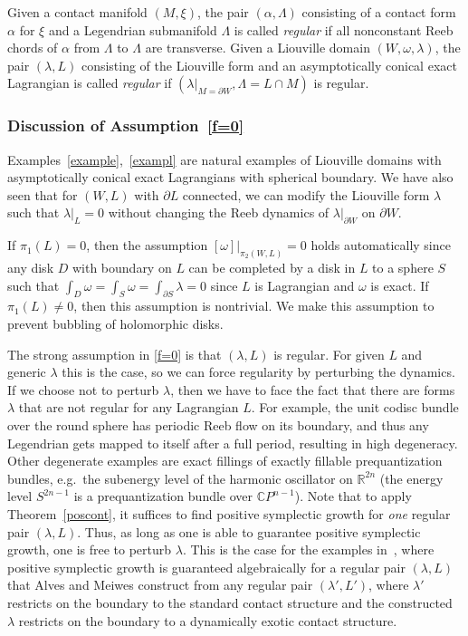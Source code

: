\documentclass{amsart}
\newcommand{\CC}{\mathbb{C}}
\newcommand{\RR}{\mathbb{R}}
\theoremstyle{definition}
\theoremstyle{remark}
\numberwithin{equation}{section}
\begin{document}
Given a contact manifold $(M,\xi)$, the pair $(\alpha,\Lambda)$ consisting of a contact form $\alpha$ for $\xi$ and a Legendrian submanifold $\Lambda$ is called \textit{regular} if all nonconstant Reeb chords of $\alpha$ from $\Lambda$ to $\Lambda$ are transverse. Given a Liouville domain $(W,\omega,\lambda)$, the pair $(\lambda, L)$ consisting of the Liouville form and an asymptotically conical exact Lagrangian is called \textit{regular} if $(\lambda|_{M=\partial W},\Lambda=L\cap M)$ is regular.

\subsubsection*{Discussion of Assumption~\ref{f=0}}
Examples~\ref{example},~\ref{exampl} are natural examples of Liouville domains with asymptotically conical exact Lagrangians with spherical boundary. We have also seen that for $(W,L)$ with $\partial L$ connected, we can modify the Liouville form $\lambda$ such that $\lambda|_L=0$ without changing the Reeb dynamics of $\lambda|_{\partial W}$ on $\partial W$. 

If $\pi_1(L)=0$, then the assumption $[\omega]|_{\pi_2(W,L)}=0$ holds automatically since any disk $D$ with boundary on $L$ can be completed by a disk in $L$ to a sphere $S$ such that $\int_D\omega=\int_S\omega =\int_{\partial S}\lambda=0$ since $L$ is Lagrangian and $\omega$ is exact. If $\pi_1(L)\neq 0$, then this assumption is nontrivial. We make this assumption to prevent bubbling of holomorphic disks.

The strong assumption in \ref{f=0} is that $(\lambda,L)$ is regular. For given $L$ and generic $\lambda$ this is the case, so we can force regularity by perturbing the dynamics. If we choose not to perturb $\lambda$, then we have to face the fact that there are forms $\lambda$ that are not regular for any Lagrangian $L$. For example, the unit codisc bundle over the round sphere has periodic Reeb flow on its boundary, and thus any Legendrian gets mapped to itself after a full period, resulting in high degeneracy. Other degenerate examples are exact fillings of exactly fillable prequantization bundles, e.g.\ the subenergy level of the harmonic oscillator on $\RR^{2n}$ (the energy level $S^{2n-1}$ is a prequantization bundle over $\CC P^{n-1}$). Note that to apply Theorem~\ref{poscont}, it suffices to find positive symplectic growth for {\it one} regular pair $(\lambda,L)$. Thus, as long as one is able to guarantee positive symplectic growth, one is free to perturb $\lambda$. This is the case for the examples in~\cite{AM17}, where positive symplectic growth is guaranteed algebraically for a regular pair $(\lambda,L)$ that Alves and Meiwes construct from any regular pair $(\lambda',L')$, where $\lambda'$ restricts on the boundary to the standard contact structure and the constructed $\lambda$ restricts on the boundary to a dynamically exotic contact structure. 
\end{document}
